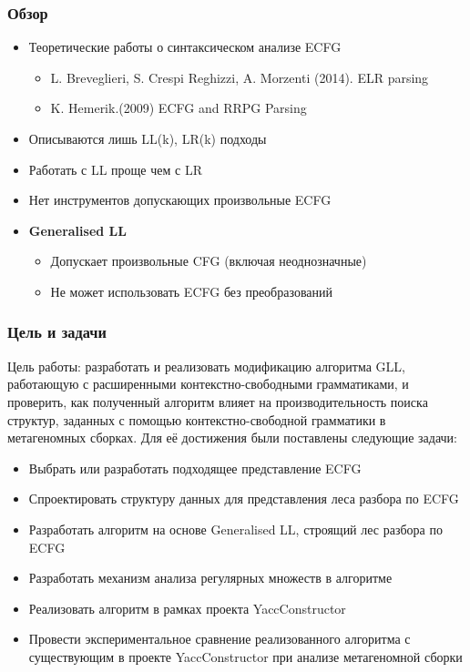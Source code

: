 \documentclass{beamer}
\begin{document}

	
	\begin{frame} 
		\frametitle{Обзор} 
		\begin{itemize}
			\item Теоретические работы о синтаксическом анализе ECFG
			\begin{itemize}
				\item L. Breveglieri, S. Crespi Reghizzi, A. Morzenti (2014). ELR parsing
				\item K. Hemerik.(2009) ECFG and RRPG Parsing
   			\end{itemize}
            \item Описываются лишь LL(k), LR(k) подходы
            \item Работать с LL проще чем с LR
        
            \item Нет инструментов допускающих произвольные ECFG
			\item \textbf{Generalised LL}
			\begin{itemize}
				\item Допускает произвольные CFG (включая неоднозначные)
				\item Не может использовать ECFG без преобразований
			\end{itemize}
		\end{itemize}
	\end{frame}

 

	\begin{frame} 
		\frametitle{Цель и задачи}
		Цель работы: разработать и реализовать модификацию алгоритма GLL, работающую с расширенными контекстно-свободными грамматиками, и проверить, как полученный алгоритм влияет на производительность поиска структур, заданных с помощью контекстно-свободной грамматики в метагеномных сборках.
		Для её достижения были поставлены следующие задачи:
		\begin{itemize}
			\item Выбрать или разработать подходящее представление ECFG
			\item Спроектировать структуру данных для представления леса разбора по ECFG
			\item Разработать алгоритм на основе Generalised LL, строящий лес разбора по ECFG
            \item Разработать механизм анализа регулярных множеств в алгоритме
			\item Реализовать алгоритм в рамках проекта YaccConstructor
			\item Провести экспериментальное сравнение реализованного алгоритма с существующим в проекте YaccConstructor при анализе метагеномной сборки
		\end{itemize}
	\end{frame}
\end{document}
